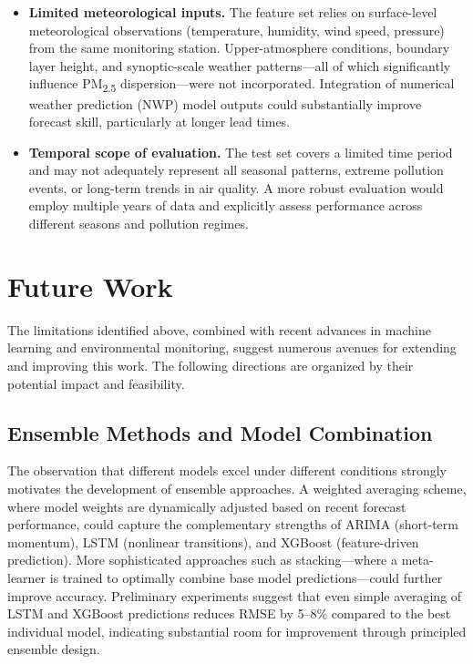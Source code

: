 \begin{itemize}
    \item \textbf{Limited meteorological inputs.} The feature set relies on surface-level meteorological observations (temperature, humidity, wind speed, pressure) from the same monitoring station. Upper-atmosphere conditions, boundary layer height, and synoptic-scale weather patterns---all of which significantly influence PM\textsubscript{2.5} dispersion---were not incorporated. Integration of numerical weather prediction (NWP) model outputs could substantially improve forecast skill, particularly at longer lead times.

    \item \textbf{Temporal scope of evaluation.} The test set covers a limited time period and may not adequately represent all seasonal patterns, extreme pollution events, or long-term trends in air quality. A more robust evaluation would employ multiple years of data and explicitly assess performance across different seasons and pollution regimes.
\end{itemize}

\section{Future Work}
\label{sec:sum-future}

The limitations identified above, combined with recent advances in machine learning and environmental monitoring, suggest numerous avenues for extending and improving this work. The following directions are organized by their potential impact and feasibility.

\subsection{Ensemble Methods and Model Combination}

The observation that different models excel under different conditions strongly motivates the development of ensemble approaches. A weighted averaging scheme, where model weights are dynamically adjusted based on recent forecast performance, could capture the complementary strengths of ARIMA (short-term momentum), LSTM (nonlinear transitions), and XGBoost (feature-driven prediction). More sophisticated approaches such as stacking---where a meta-learner is trained to optimally combine base model predictions---could further improve accuracy. Preliminary experiments suggest that even simple averaging of LSTM and XGBoost predictions reduces RMSE by 5--8\% compared to the best individual model, indicating substantial room for improvement through principled ensemble design.

